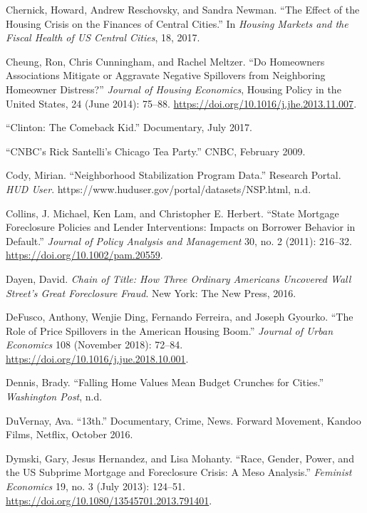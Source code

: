 \documentclass[12pt,oneside]{psthesis}
\begin{document}
\leavevmode\hypertarget{ref-chernick2017effect}{}%
Chernick, Howard, Andrew Reschovsky, and Sandra Newman. ``The Effect of the Housing Crisis on the Finances of Central Cities.'' In \emph{Housing Markets and the Fiscal Health of US Central Cities}, 18, 2017.

\leavevmode\hypertarget{ref-cheung2014homeowners}{}%
Cheung, Ron, Chris Cunningham, and Rachel Meltzer. ``Do Homeowners Associations Mitigate or Aggravate Negative Spillovers from Neighboring Homeowner Distress?'' \emph{Journal of Housing Economics}, Housing Policy in the United States, 24 (June 2014): 75--88. \url{https://doi.org/10.1016/j.jhe.2013.11.007}.

\leavevmode\hypertarget{ref-albright2017clinton}{}%
``Clinton: The Comeback Kid.'' Documentary, July 2017.

\leavevmode\hypertarget{ref-santelli2009cnbc}{}%
``CNBC's Rick Santelli's Chicago Tea Party.'' CNBC, February 2009.

\leavevmode\hypertarget{ref-cody2010neighborhood}{}%
Cody, Mirian. ``Neighborhood Stabilization Program Data.'' Research Portal. \emph{HUD User}. https://www.huduser.gov/portal/datasets/NSP.html, n.d.

\leavevmode\hypertarget{ref-collins2011state}{}%
Collins, J. Michael, Ken Lam, and Christopher E. Herbert. ``State Mortgage Foreclosure Policies and Lender Interventions: Impacts on Borrower Behavior in Default.'' \emph{Journal of Policy Analysis and Management} 30, no. 2 (2011): 216--32. \url{https://doi.org/10.1002/pam.20559}.

\leavevmode\hypertarget{ref-dayenChainTitleHow2016}{}%
Dayen, David. \emph{Chain of Title: How Three Ordinary Americans Uncovered Wall Street's Great Foreclosure Fraud}. New York: The New Press, 2016.

\leavevmode\hypertarget{ref-defusco2018role}{}%
DeFusco, Anthony, Wenjie Ding, Fernando Ferreira, and Joseph Gyourko. ``The Role of Price Spillovers in the American Housing Boom.'' \emph{Journal of Urban Economics} 108 (November 2018): 72--84. \url{https://doi.org/10.1016/j.jue.2018.10.001}.

\leavevmode\hypertarget{ref-dennis2011falling}{}%
Dennis, Brady. ``Falling Home Values Mean Budget Crunches for Cities.'' \emph{Washington Post}, n.d.

\leavevmode\hypertarget{ref-duvernay201613th}{}%
DuVernay, Ava. ``13th.'' Documentary, Crime, News. Forward Movement, Kandoo Films, Netflix, October 2016.

\leavevmode\hypertarget{ref-dymski2013race}{}%
Dymski, Gary, Jesus Hernandez, and Lisa Mohanty. ``Race, Gender, Power, and the US Subprime Mortgage and Foreclosure Crisis: A Meso Analysis.'' \emph{Feminist Economics} 19, no. 3 (July 2013): 124--51. \url{https://doi.org/10.1080/13545701.2013.791401}.
\end{document}

